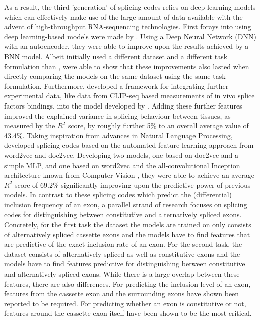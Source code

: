 As a result, the third 'generation' of splicing codes relies on deep learning models which can effectively make use of the large amount of data available with the advent of high-throughput RNA-sequencing technologies. First forays into using deep learning-based models were made by \cite{leung2014}. Using a Deep Neural Network (DNN) with an autoencoder, they were able to improve upon the results achieved by a BNN model. Albeit \cite{leung2014} initially used a different dataset and a different task formulation than \cite{bnnsplicing}, \cite{jha} were able to show that these improvements also lasted when directly comparing the models on the same dataset using the same task formulation. Furthermore, \cite{jha} developed a framework for integrating further experimental data, like data from CLIP-seq based measurements of in vivo splice factors bindings, into the model developed by \cite{leung2014}. Adding these further features improved the explained variance in splicing behaviour between tissues, as measured by the $R^2$ score, by roughly further 5\% to an overall average value of 43.4\%.
Taking inspiration from advances in Natural Language Processing, \cite{d2vsplicing} developed splicing codes based on the automated feature learning approach from word2vec and doc2vec. Developing two models, one based on doc2vec and a simple MLP, and one based on word2vec and the all-convolutional Inception architecture known from Computer Vision \cite{inception}, they were able to achieve an average $R^2$ score of 69.2\% significantly improving upon the predictive power of previous models.
In contrast to these splicing codes which predict the (differential) inclusion frequency of an exon, a parallel strand of research focuses on splicing codes for distinguishing between constitutive and alternatively spliced exons. Concretely, for the first task the dataset the models are trained on only consists of alternatively spliced cassette exons and the models have to find features that are predictive of the exact inclusion rate of an exon.
For the second task, the dataset consists of alternatively spliced as well as constitutive exons and the models have to find features predictive for distinguishing between constitutive and alternatively spliced exons.
While there is a large overlap between these features, there are also differences.
For predicting the inclusion level of an exon, features from the cassette exon and the surrounding exons have shown been reported to be required. \cite{splicingcodegood1} For predicting whether an exon is constitutive or not, features around the cassette exon itself have been shown to be the most critical. \cite{featurearoundexonjunc}
